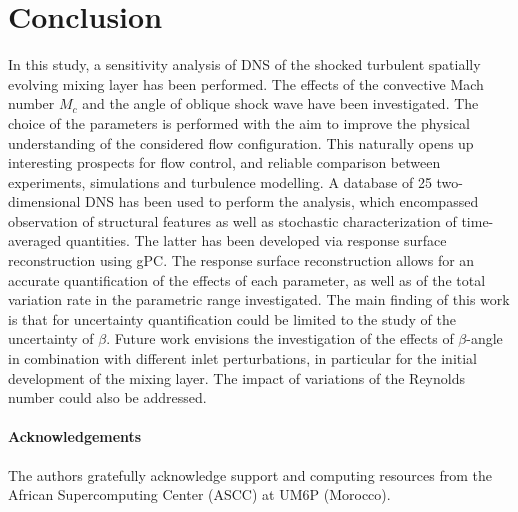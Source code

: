 \documentclass[conf]{new-aiaa}
\begin{document}
\section{Conclusion}
In this study, a sensitivity analysis of DNS of the shocked turbulent spatially evolving mixing layer has been performed. The effects of the convective Mach number $M_c$ and the angle of oblique shock wave have been investigated.
%
The choice of the parameters is performed with the aim to improve the physical understanding of the considered flow configuration.
%
This naturally opens up interesting prospects for flow control, and reliable comparison between experiments, simulations and turbulence modelling.
%
A database of 25 two-dimensional DNS has been used to perform the analysis, which encompassed observation of structural features as well as stochastic characterization of time-averaged quantities.
%
The latter has been developed via response surface reconstruction using gPC.
%
The response surface reconstruction allows for an accurate quantification of the effects of each parameter, as well as of the total variation rate in the parametric range investigated.
%
The main finding of this work is that for uncertainty quantification could be limited to the study of the uncertainty of $\beta$.
%
Future work envisions the investigation of the effects of $\beta$-angle in combination with different inlet perturbations, in particular for the initial development of the mixing layer. The impact of variations of the Reynolds number could also be addressed. 
\paragraph{Acknowledgements}
The authors gratefully acknowledge support and computing resources from the African Supercomputing Center (ASCC) at UM6P (Morocco).

\end{document}
